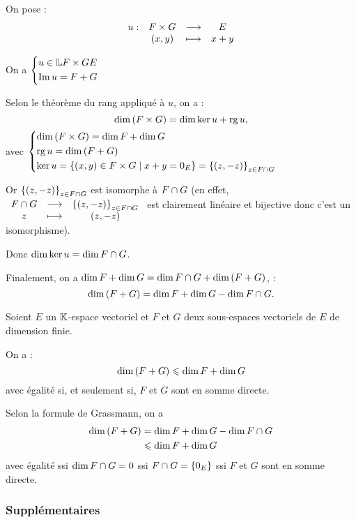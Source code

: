 \begin{dem}
On pose : \[\begin{array}[t]{cccc}u : & F\times G & \longrightarrow & E \\ & \left(x,y\right) & \longmapsto & x+y\end{array}\]

On a \(\begin{dcases}
u\in\mathbb{L}{F\times G}{E} \\
\operatorname{Im} u=F+G
\end{dcases}\)

Selon le théorème du rang appliqué à \(u\), on a : \[\dim\left(F\times G\right)=\dim\ker u+\operatorname{rg} u,\] avec \(\begin{dcases}
\dim\left(F\times G\right)=\dim F+\dim G \\
\operatorname{rg} u=\dim\left(F+G\right) \\
\ker u=\left\lbrace\left(x,y\right)\in F\times G\;\middle|\; x+y=0_E\right\rbrace=\left\lbrace\left(z,-z\right)\right\rbrace_{z\in F\cap G}
\end{dcases}\)

Or \(\left\lbrace\left(z,-z\right)\right\rbrace_{z\in F\cap G}\) est isomorphe à \(F\cap G\) (en effet, \(\begin{array}[t]{ccc}F\cap G & \longrightarrow & \left\lbrace\left(z,-z\right)\right\rbrace_{z\in F\cap G} \\ z & \longmapsto & \left(z,-z\right)\end{array}\) est clairement linéaire et bijective donc c'est un isomorphisme).

Donc \(\dim\ker u=\dim F\cap G\).

Finalement, on a \(\dim F+\dim G=\dim F\cap G+\dim\left(F+G\right)\), \cad : \[\dim\left(F+G\right)=\dim F+\dim G-\dim F\cap G.\]
\end{dem}

\begin{cor}
Soient \(E\) un \(\mathbb{K}\)-espace vectoriel et \(F\) et \(G\) deux sous-espaces vectoriels de \(E\) de dimension finie.

On a : \[\dim\left(F+G\right)\leqslant\dim F+\dim G\] avec égalité si, et seulement si, \(F\) et \(G\) sont en somme directe.
\end{cor}

\begin{dem}
Selon la formule de Grassmann, on a \[\begin{aligned}
\dim\left(F+G\right)&=\dim F+\dim G-\dim F\cap G \\
&\leqslant\dim F+\dim G
\end{aligned}\] avec égalité ssi \(\dim F\cap G=0\) ssi \(F\cap G=\left\lbrace0_E\right\rbrace\) ssi \(F\) et \(G\) sont en somme directe.
\end{dem}

\subsubsection{Supplémentaires}


